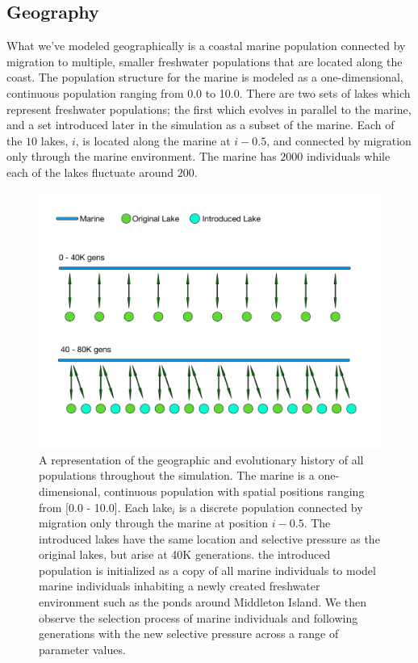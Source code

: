 \documentclass{article}
\begin{document}
\subsection*{Geography}

What we've modeled geographically is a coastal marine population 
connected by migration to multiple, smaller freshwater populations that are located along the coast.
The population structure for the marine is modeled as a one-dimensional, continuous population
ranging from 0.0 to 10.0.
There are two sets of lakes which represent freshwater populations; 
the first which evolves in parallel to the marine, 
and a set introduced later in the simulation as a subset of the marine. 
Each of the $10$ lakes, $i$, is located along the marine at $i - 0.5$, 
and connected by migration only through the marine environment. 
The marine has $2000$ individuals while 
each of the lakes fluctuate around $200$. 

\begin{figure}
	\begin{center}
  		\includegraphics[width=0.6\linewidth]{GeographyDiagram}
  		\caption{A representation of the geographic and evolutionary history of all populations throughout the simulation. 
		The marine is a one-dimensional, continuous population with spatial positions ranging from [0.0 - 10.0]. Each 
		lake$_{i}$ is a discrete population connected by migration only through the marine at position $i - 0.5$. The introduced lakes 
		have the same location and selective pressure as the original lakes, but arise at 40K generations.
		the introduced population is initialized as a copy of all marine individuals to model marine 
		individuals inhabiting a newly created freshwater environment such as the ponds around Middleton Island.
		We then observe the selection process of marine individuals and following generations 
		with the new selective pressure across a range of parameter values. 
		}
  		\label{fig:Geo}
	\end{center}
\end{figure}
\end{document}
